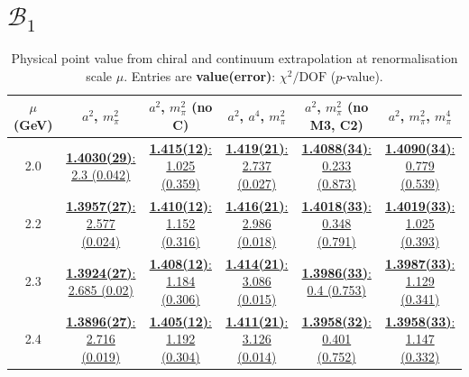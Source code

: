 \documentclass[12pt]{extarticle}
\begin{document}
\section{$\mathcal{B}_1$}
\begin{table}[h!]
\begin{center}
\begin{tabular}{|c|c|c|c|c|c|}
\hline
$\mu$ (GeV) & $a^2$, $m_\pi^2$& $a^2$, $m_\pi^2$ (no C)& $a^2$, $a^4$, $m_\pi^2$& $a^2$, $m_\pi^2$ (no M3, C2)& $a^2$, $m_\pi^2$, $m_\pi^4$\\
\hline
2.0& \hyperlink{VVpAA/NPR/a2m2_20.pdf.1}{\textbf{1.4030(29)}: 2.3 (0.042)} & \hyperlink{VVpAA/NPR/a2m2noC_20.pdf.1}{\textbf{1.415(12)}: 1.025 (0.359)} & \hyperlink{VVpAA/NPR/a2a4m2_20.pdf.1}{\textbf{1.419(21)}: 2.737 (0.027)} & \hyperlink{VVpAA/NPR/a2m2mcut_20.pdf.1}{\textbf{1.4088(34)}: 0.233 (0.873)} & \hyperlink{VVpAA/NPR/a2m2m4_20.pdf.1}{\textbf{1.4090(34)}: 0.779 (0.539)}\\
2.2& \hyperlink{VVpAA/NPR/a2m2_22.pdf.1}{\textbf{1.3957(27)}: 2.577 (0.024)} & \hyperlink{VVpAA/NPR/a2m2noC_22.pdf.1}{\textbf{1.410(12)}: 1.152 (0.316)} & \hyperlink{VVpAA/NPR/a2a4m2_22.pdf.1}{\textbf{1.416(21)}: 2.986 (0.018)} & \hyperlink{VVpAA/NPR/a2m2mcut_22.pdf.1}{\textbf{1.4018(33)}: 0.348 (0.791)} & \hyperlink{VVpAA/NPR/a2m2m4_22.pdf.1}{\textbf{1.4019(33)}: 1.025 (0.393)}\\
2.3& \hyperlink{VVpAA/NPR/a2m2_23.pdf.1}{\textbf{1.3924(27)}: 2.685 (0.02)} & \hyperlink{VVpAA/NPR/a2m2noC_23.pdf.1}{\textbf{1.408(12)}: 1.184 (0.306)} & \hyperlink{VVpAA/NPR/a2a4m2_23.pdf.1}{\textbf{1.414(21)}: 3.086 (0.015)} & \hyperlink{VVpAA/NPR/a2m2mcut_23.pdf.1}{\textbf{1.3986(33)}: 0.4 (0.753)} & \hyperlink{VVpAA/NPR/a2m2m4_23.pdf.1}{\textbf{1.3987(33)}: 1.129 (0.341)}\\
2.4& \hyperlink{VVpAA/NPR/a2m2_24.pdf.1}{\textbf{1.3896(27)}: 2.716 (0.019)} & \hyperlink{VVpAA/NPR/a2m2noC_24.pdf.1}{\textbf{1.405(12)}: 1.192 (0.304)} & \hyperlink{VVpAA/NPR/a2a4m2_24.pdf.1}{\textbf{1.411(21)}: 3.126 (0.014)} & \hyperlink{VVpAA/NPR/a2m2mcut_24.pdf.1}{\textbf{1.3958(32)}: 0.401 (0.752)} & \hyperlink{VVpAA/NPR/a2m2m4_24.pdf.1}{\textbf{1.3958(33)}: 1.147 (0.332)}\\
\hline
\end{tabular}
\caption{Physical point value from chiral and continuum extrapolation at renormalisation scale $\mu$. Entries are \textbf{value(error)}: $\chi^2/\text{DOF}$ ($p$-value).}
\end{center}
\end{table}
\end{document}
